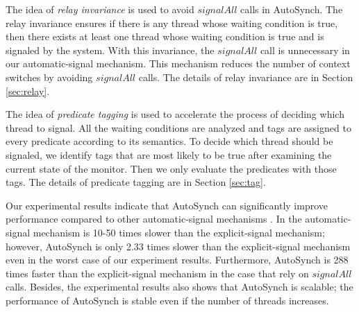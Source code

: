 \documentclass[preprint]{sigplanconf}
\begin{document}
The idea of {\em relay invariance} is used to avoid $signalAll$ calls in AutoSynch.
The relay invariance ensures if there is any thread whose waiting condition is true, then
there exists at least one thread whose waiting condition is  true and is signaled by the system.
With this invariance, the $signalAll$ call 
is unnecessary in our automatic-signal mechanism. This mechanism reduces 
the number of context switches by avoiding $signalAll$ calls. 
The details of relay invariance are in Section \ref{sec:relay}.


The idea of {\em predicate tagging} is used to accelerate the process of deciding which thread to signal.
All the waiting conditions are analyzed and tags are assigned to every predicate
according to its semantics. To decide which thread should be 
signaled, we identify tags that are most likely to be true after examining the 
current state of the monitor. Then we only evaluate the predicates with 
those tags. 
The details of predicate tagging are in Section \ref{sec:tag}.

Our experimental results indicate that AutoSynch can significantly improve
performance compared to other automatic-signal mechanisms \cite{bh05}. In \cite{bfc95,bh05}
the automatic-signal mechanism is 10-50 times
slower than the explicit-signal mechanism; however, AutoSynch is 
only 2.33 times slower than the explicit-signal mechanism even in the worst 
case of our experiment results. Furthermore, AutoSynch is 288 
times faster than the explicit-signal mechanism in the case that rely on 
$signalAll$ calls. Besides, the experimental results also shows that AutoSynch 
is scalable; the performance of AutoSynch is stable even if the number of 
threads increases. 
\end{document}
